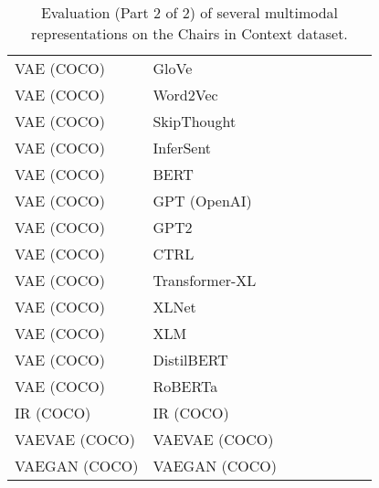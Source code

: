 \documentclass[11pt,a4paper]{article}
\begin{document}
\begin{table*}[t!]
\begin{tabular}{llcccccc}
VAE (COCO) & GloVe & & & & & & \\
VAE (COCO) & Word2Vec & & & & & & \\
VAE (COCO) & SkipThought & & & & & & \\
VAE (COCO) & InferSent & & & & & & \\
VAE (COCO) & BERT & & & & & & \\
VAE (COCO) & GPT (OpenAI) & & & & & & \\
VAE (COCO) & GPT2 & & & & & & \\
VAE (COCO) & CTRL & & & & & & \\
VAE (COCO) & Transformer-XL & & & & & & \\
VAE (COCO) & XLNet & & & & & & \\
VAE (COCO) & XLM & & & & & & \\
VAE (COCO) & DistilBERT & & & & & & \\
VAE (COCO) & RoBERTa & & & & & & \\
IR (COCO) & IR (COCO) & & & & & & \\
VAEVAE (COCO) & VAEVAE (COCO) & & & & & & \\
VAEGAN (COCO) & VAEGAN (COCO) & & & & & & \\
\hline
\end{tabular}
\caption{\label{table:colors} Evaluation (Part 2 of 2) of several multimodal representations on the Chairs in Context dataset.}
\end{table*}
\end{document}
